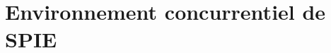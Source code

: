 

\newcommand{\mainTitle}{\'Etude préalable - SPIE}
\newcommand{\secondTitle}{Benchmarking}
\newcommand{\documentRef}{DEB-B/4401/1}




\listoftodos
\newpage

\tableofcontents
\listoffigures
\listoftables
\newpage

\part{Environnement concurrentiel de SPIE}
\setcounter{section}{0}




